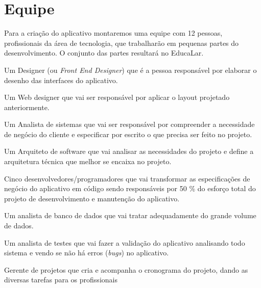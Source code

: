 \chapter[Equipe]{Equipe}

Para a criação do aplicativo montaremos uma equipe com 12 pessoas, profissionais da área de tecnologia, que trabalharão em pequenas partes do desenvolvimento. O conjunto das partes resultará no EducaLar.

\begin{alineas}
    \item Um Designer (ou \emph{Front End Designer}) que é a pessoa responsável por elaborar o desenho das interfaces do aplicativo.
    \item Um Web designer que vai ser responsável por aplicar o layout projetado anteriormente.
    \item Um Analista de sistemas que vai ser responsável por compreender a necessidade de negócio do cliente e especificar por escrito o que precisa ser feito no projeto.
    \item Um Arquiteto de software que vai analisar as necessidades do projeto e define a arquitetura técnica que melhor se encaixa no projeto.
    \item Cinco desenvolvedores/programadores que vai transformar as especificações de negócio do aplicativo em código sendo responsáveis por 50 \% do esforço total do projeto de desenvolvimento e manutenção do aplicativo.
    \item Um analista de banco de dados que vai tratar adequadamente do grande volume de dados.
    \item Um analista de testes que vai fazer a validação do aplicativo analisando todo sistema e vendo se não há erros (\emph{bugs}) no aplicativo.
    \item Gerente de projetos que cria e acompanha o cronograma do projeto, dando as diversas tarefas para os profissionais
\end{alineas}


